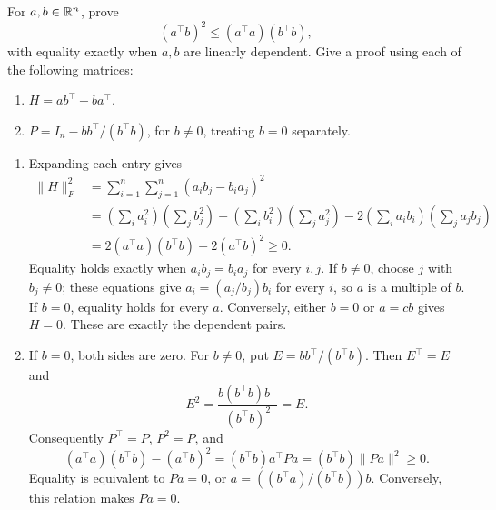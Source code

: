 \begin{problem}\label{ex:06:matrix-schwarz}
For \(a,b\in\mathbb R^n\), prove
\[
(a^\top b)^2\leqslant(a^\top a)(b^\top b),
\]
with equality exactly when \(a,b\) are linearly dependent.
Give a proof using each of the following matrices:
\begin{enumerate}
\item \(H=ab^\top-ba^\top\).
\item \(P=I_n-bb^\top/(b^\top b)\), for \(b\ne0\), treating \(b=0\) separately.
\end{enumerate}
\end{problem}
\begin{solution}
\begin{enumerate}
\item Expanding each entry gives
\[
\begin{aligned}
\|H\|_F^2
&=\sum_{i=1}^n\sum_{j=1}^n(a_i b_j-b_i a_j)^2\\
&=\left(\sum_i a_i^2\right)\left(\sum_j b_j^2\right)
 +\left(\sum_i b_i^2\right)\left(\sum_j a_j^2\right)
 -2\left(\sum_i a_i b_i\right)\left(\sum_j a_j b_j\right)\\
&=2(a^\top a)(b^\top b)-2(a^\top b)^2\geqslant0.
\end{aligned}
\]
Equality holds exactly when \(a_i b_j=b_i a_j\) for every \(i,j\).
If \(b\ne0\), choose \(j\) with \(b_j\ne0\); these equations give
\(a_i=(a_j/b_j)b_i\) for every \(i\), so \(a\) is a multiple of \(b\).
If \(b=0\), equality holds for every \(a\).
Conversely, either \(b=0\) or \(a=cb\) gives \(H=0\).
These are exactly the dependent pairs.
\item If \(b=0\), both sides are zero.
For \(b\ne0\), put \(E=bb^\top/(b^\top b)\).
Then \(E^\top=E\) and
\[
E^2=\frac{b(b^\top b)b^\top}{(b^\top b)^2}=E.
\]
Consequently \(P^\top=P\), \(P^2=P\), and
\[
(a^\top a)(b^\top b)-(a^\top b)^2
=(b^\top b)a^\top Pa
=(b^\top b)\|Pa\|^2\geqslant0.
\]
Equality is equivalent to \(Pa=0\), or
\(a=((b^\top a)/(b^\top b))b\).
Conversely, this relation makes \(Pa=0\).
\end{enumerate}
\end{solution}


